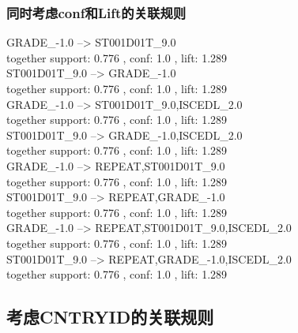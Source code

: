 \documentclass[12pt, a4paper, oneside]{ctexart}
\begin{document}
    \subsubsection{同时考虑conf和Lift的关联规则 } 
    GRADE\_-1.0 --> ST001D01T\_9.0 \\
    together support: 0.776 , conf: 1.0 , lift: 1.289\\
    ST001D01T\_9.0 --> GRADE\_-1.0 \\
    together support: 0.776 , conf: 1.0 , lift: 1.289\\
    GRADE\_-1.0 --> ST001D01T\_9.0,ISCEDL\_2.0 \\
    together support: 0.776 , conf: 1.0 , lift: 1.289\\
    ST001D01T\_9.0 --> GRADE\_-1.0,ISCEDL\_2.0 \\
    together support: 0.776 , conf: 1.0 , lift: 1.289\\
    GRADE\_-1.0 --> REPEAT,ST001D01T\_9.0 \\
    together support: 0.776 , conf: 1.0 , lift: 1.289\\
    ST001D01T\_9.0 --> REPEAT,GRADE\_-1.0 \\
    together support: 0.776 , conf: 1.0 , lift: 1.289\\
    GRADE\_-1.0 --> REPEAT,ST001D01T\_9.0,ISCEDL\_2.0 \\
    together support: 0.776 , conf: 1.0 , lift: 1.289\\
    ST001D01T\_9.0 --> REPEAT,GRADE\_-1.0,ISCEDL\_2.0 \\
    together support: 0.776 , conf: 1.0 , lift: 1.289\\
    
\subsection{考虑CNTRYID的关联规则}
\end{document}

